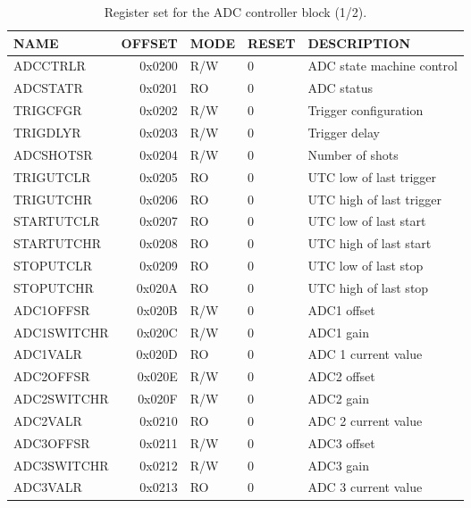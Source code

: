 \documentclass{article}
\begin{document}
\begin{table}[htbp]
  \centering
  \begin{tabularx}{\textwidth}{|l|r|l|l|X|}
    \hline
    \textbf{NAME} & \textbf{OFFSET} & \textbf{MODE} & \textbf{RESET} & \textbf{DESCRIPTION} \\
    \hline
    \hline
    ADCCTRLR & 0x0200 & R/W & 0 & ADC state machine control\\
    \hline
    ADCSTATR & 0x0201 & RO & 0 & ADC status \\
    \hline
    TRIGCFGR & 0x0202 & R/W & 0 & Trigger configuration \\
    \hline
    TRIGDLYR & 0x0203 & R/W & 0 & Trigger delay \\
    \hline
    ADCSHOTSR & 0x0204 & R/W & 0 & Number of shots \\
    \hline
    TRIGUTCLR & 0x0205 & RO & 0 & UTC low of last trigger \\
    \hline
    TRIGUTCHR & 0x0206 & RO & 0 & UTC high of last trigger \\
    \hline
    STARTUTCLR & 0x0207 & RO & 0 & UTC low of last start \\
    \hline
    STARTUTCHR & 0x0208 & RO & 0 & UTC high of last start \\
    \hline
    STOPUTCLR & 0x0209 & RO & 0 & UTC low of last stop \\
    \hline
    STOPUTCHR & 0x020A & RO & 0 & UTC high of last stop \\
    \hline
    ADC1OFFSR & 0x020B & R/W & 0 & ADC1 offset \\
    \hline
    ADC1SWITCHR & 0x020C & R/W & 0 & ADC1 gain \\
    \hline
    ADC1VALR & 0x020D & RO & 0 & ADC 1 current value \\
    \hline
    ADC2OFFSR & 0x020E & R/W & 0 & ADC2 offset \\
    \hline
    ADC2SWITCHR & 0x020F & R/W & 0 & ADC2 gain \\
    \hline
    ADC2VALR & 0x0210 & RO & 0 & ADC 2 current value \\
    \hline
    ADC3OFFSR & 0x0211 & R/W & 0 & ADC3 offset \\
    \hline
    ADC3SWITCHR & 0x0212 & R/W & 0 & ADC3 gain \\
    \hline
    ADC3VALR & 0x0213 & RO & 0 & ADC 3 current value \\
    \hline
  \end{tabularx}
  \caption{Register set for the ADC controller block (1/2).}
  \label{tab:adc_control1}
\end{table}
\end{document}

